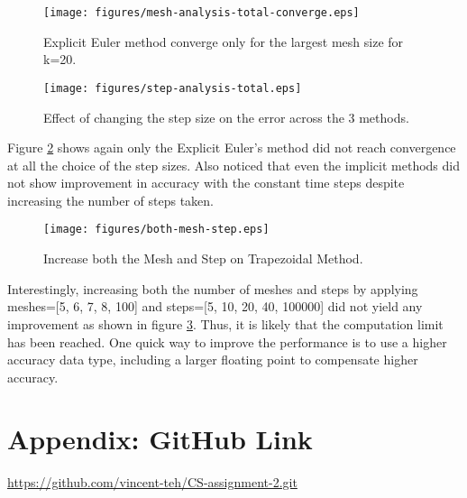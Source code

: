 \documentclass{article}
\begin{document}
\begin{figure}[H]
  \centering
  \texttt{[image: figures/mesh-analysis-total-converge.eps]}
  \caption{Explicit Euler method converge only for the largest mesh size for k=20.}
  \label{fig:figures-mesh-analysis-total-converge-eps}
\end{figure}


\begin{figure}[H]
  \centering
  \texttt{[image: figures/step-analysis-total.eps]}
  \caption{Effect of changing the step size on the error across the 3 methods.}
  \label{fig:figures-step-analysis-total-eps}
\end{figure}
Figure \ref{fig:figures-step-analysis-total-eps} shows again only the Explicit Euler's method did not reach convergence at all the choice of the step sizes. Also noticed that even the implicit methods did not show improvement in accuracy with the constant time steps despite increasing the number of steps taken.

\begin{figure}[H]
  \centering
  \texttt{[image: figures/both-mesh-step.eps]}
  \caption{Increase both the Mesh and Step on Trapezoidal Method.}
  \label{fig:figures-both-mesh-step-eps}
\end{figure}
Interestingly, increasing both the number of meshes and steps by applying meshes=[5, 6, 7, 8, 100] and steps=[5, 10, 20, 40, 100000] did not yield any improvement as shown in figure \ref{fig:figures-both-mesh-step-eps}. Thus, it is likely that the computation limit has been reached. One quick way to improve the performance is to use a higher accuracy data type, including a larger floating point to compensate higher accuracy.


\newpage
\section{Appendix: GitHub Link}%
\label{sec:Appendix: GitHub Link}
\url{https://github.com/vincent-teh/CS-assignment-2.git}
\end{document}

